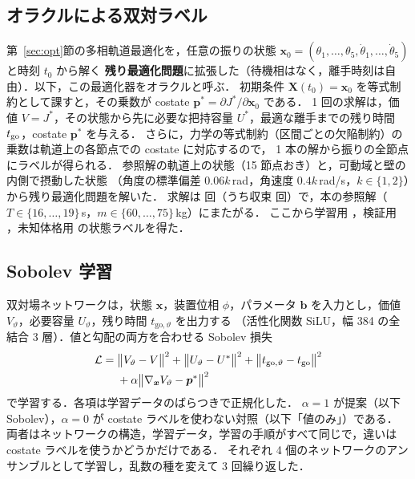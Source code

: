 \subsection{オラクルによる双対ラベル}
第~\ref{sec:opt}節の多相軌道最適化を，任意の振りの状態 $\bm x_0=(\theta_1,\dots,\theta_5,\dot\theta_1,\dots,\dot\theta_5)$ と時刻 $t_0$ から解く
\textbf{残り最適化問題}に拡張した（待機相はなく，離手時刻は自由）．以下，この最適化器をオラクルと呼ぶ．
初期条件 $\bm X(t_0)=\bm x_0$ を等式制約として課すと，その乗数が costate $\bm p^*=\partial J^*/\partial\bm x_0$ である．
1 回の求解は，価値 $V=J^*$，その状態から先に必要な把持容量 $U^*$，最適な離手までの残り時間 $t_{\mathrm{go}}$，costate $\bm p^*$ を与える．
さらに，力学の等式制約（区間ごとの欠陥制約）の乗数は軌道上の各節点での costate に対応するので，
1 本の解から振りの全節点にラベルが得られる．
参照解の軌道上の状態（15 節点おき）と，可動域と壁の内側で摂動した状態
（角度の標準偏差 $0.06k$\,rad，角速度 $0.4k$\,rad/s，$k\in\{1,2\}$）から残り最適化問題を解いた．
求解は \dsNsolve 回（うち収束 \dsNok 回）で，\dsNref 本の参照解（$T\in\{16,\dots,19\}$\,s，$m\in\{60,\dots,75\}$\,kg）にまたがる．
ここから学習用 \fitNtrainS，検証用 \fitNvalS，未知体格用 \fitNholdS の状態ラベルを得た．

\subsection{Sobolev 学習}
双対場ネットワークは，状態 $\bm x$，装置位相 $\phi$，パラメータ $\bm b$ を入力とし，価値 $V_\vartheta$，必要容量 $U_\vartheta$，残り時間 $t_{\mathrm{go},\vartheta}$ を出力する
（活性化関数 SiLU，幅 384 の全結合 3 層）．値と勾配の両方を合わせる Sobolev 損失~\cite{czarnecki2017}
\begin{align}
\mathcal L={}&\bigl\|V_\vartheta-V\bigr\|^2+\bigl\|U_\vartheta-U^*\bigr\|^2+\bigl\|t_{\mathrm{go},\vartheta}-t_{\mathrm{go}}\bigr\|^2\nonumber\\
&+\alpha\bigl\|\nabla_{\bm x}V_\vartheta-\bm p^*\bigr\|^2
\label{eq:sobolev}
\end{align}
で学習する．各項は学習データのばらつきで正規化した．
$\alpha=1$ が提案（以下 Sobolev），$\alpha=0$ が costate ラベルを使わない対照（以下「値のみ」）である．
両者はネットワークの構造，学習データ，学習の手順がすべて同じで，違いは costate ラベルを使うかどうかだけである．
それぞれ 4 個のネットワークのアンサンブルとして学習し，乱数の種を変えて 3 回繰り返した．

